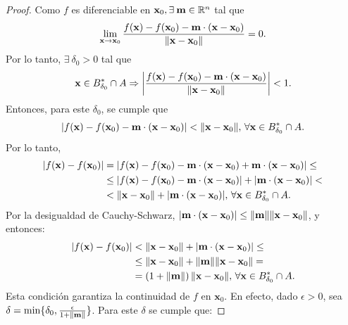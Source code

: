 \begin{proof}  Como $f$ es diferenciable en $\mathbf{x}_0, \exists\:\mathbf{m} \in \mathbb{R}^n$ tal que
 \[
  \lim_{\mathbf{x} \to \mathbf{x}_0} \frac{f(\mathbf{x}) - f(\mathbf{x}_0) - \mathbf{m} \cdot (\mathbf{x} - \mathbf{x}_0)}{\norm{\mathbf{x} - \mathbf{x}_0}} = 0.
 \]
Por lo tanto, $\exists\:\delta_0 > 0$ tal que 
\[
 \mathbf{x} \in B_{\delta_0}^* \cap A \Rightarrow 
 \abs{ \frac{f(\mathbf{x}) - f(\mathbf{x}_0) - \mathbf{m} \cdot (\mathbf{x} - \mathbf{x}_0)}{\norm{\mathbf{x} - \mathbf{x}_0}} } < 1.
\]
Entonces, para este $\delta_0$, se cumple que
\[
 \abs{ f(\mathbf{x}) - f(\mathbf{x}_0) - \mathbf{m} \cdot (\mathbf{x} - \mathbf{x}_0) } < \norm{\mathbf{x} - \mathbf{x}_0}, \, \forall \mathbf{x} \in B_{\delta_0}^* \cap A.
\]
Por lo tanto,
\begin{align*}
\abs{ f(\mathbf{x}) - f(\mathbf{x}_0) } &=   \abs{ f(\mathbf{x}) - f(\mathbf{x}_0) - \mathbf{m} \cdot (\mathbf{x} - \mathbf{x}_0) + \mathbf{m} \cdot (\mathbf{x} - \mathbf{x}_0) } \le \\
                      &\le \abs{ f(\mathbf{x}) - f(\mathbf{x}_0) - \mathbf{m} \cdot (\mathbf{x} - \mathbf{x}_0) } + \abs{ \mathbf{m} \cdot (\mathbf{x} - \mathbf{x}_0) } < \\
                      &< \norm{\mathbf{x} - \mathbf{x}_0} + \abs{ \mathbf{m} \cdot (\mathbf{x} - \mathbf{x}_0) }, \, 
                      \forall \mathbf{x} \in B^*_{\delta_0} \cap A.
\end{align*}
Por la desigualdad de Cauchy-Schwarz, $\abs{ \mathbf{m} \cdot (\mathbf{x} - \mathbf{x}_0) } \le \norm{\mathbf{m}} \norm{\mathbf{x} - \mathbf{x}_0}$, y entonces:
\begin{align*}
\abs{ f(\mathbf{x}) - f(\mathbf{x}_0) } &< \norm{\mathbf{x} - \mathbf{x}_0} + \abs{ \mathbf{m} \cdot (\mathbf{x} - \mathbf{x}_0) } \le \\
                      &\le \norm{\mathbf{x} - \mathbf{x}_0} + \norm{\mathbf{m}} \norm{\mathbf{x} - \mathbf{x}_0} = \\
                      &=  \left( 1 + \norm{\mathbf{m}} \right) \norm{\mathbf{x} - \mathbf{x}_0}, \, 
                      \forall \mathbf{x} \in B^*_{\delta_0} \cap A.
\end{align*}
Esta condici\'on garantiza la continuidad de $f$ en $\mathbf{x}_0$. En efecto, dado $\epsilon > 0$, sea $\delta = \min \{\delta_0, \frac{\epsilon}{1 + \norm{\mathbf{m}}} \}$. Para este $\delta$ se cumple que:

\end{proof}

